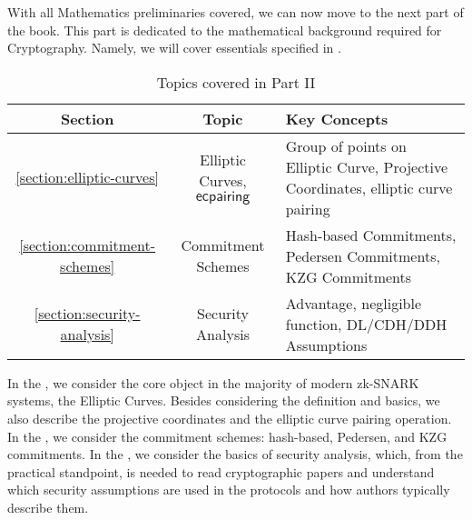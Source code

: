 \documentclass[../../lecture-notes-148x210.tex]{subfiles}
\begin{document}
With all Mathematics preliminaries covered, we can now move to the next part of
the book. This part is dedicated to the mathematical background required for
Cryptography. Namely, we will cover essentials specified in .

\begin{table}[H]
    \centering
    \begin{tabularx}{\textwidth}{|c|c|X|}
        \hline
        \rowcolor{green!30}\textbf{Section} & \textbf{Topic} & \textbf{Key Concepts} \\
        \hline
        \rowcolor{green!10}\ref{section:elliptic-curves} & Elliptic Curves, $\mathsf{ecpairing}$ & Group of points on Elliptic Curve, Projective Coordinates, elliptic curve pairing \\
        \hline
        \rowcolor{green!20}\ref{section:commitment-schemes} & Commitment Schemes &
        Hash-based Commitments, Pedersen Commitments, KZG Commitments \\
        \hline
        \rowcolor{green!10}\ref{section:security-analysis} & Security Analysis & Advantage, negligible function, DL/CDH/DDH Assumptions \\
        \hline
    \end{tabularx}
    \caption{Topics covered in Part II}
    \label{tab:essentialls-2}
\end{table}

In the , we consider the core object in the
majority of modern zk-SNARK systems, the Elliptic Curves. Besides considering
the definition and basics, we also describe the projective coordinates and the
elliptic curve pairing operation. In the , we
consider the commitment schemes: hash-based, Pedersen, and KZG commitments. In
the , we consider the basics of security
analysis, which, from the practical standpoint, is needed to read 
cryptographic papers and understand which security assumptions are used in the
protocols and how authors typically describe them.
\end{document}
